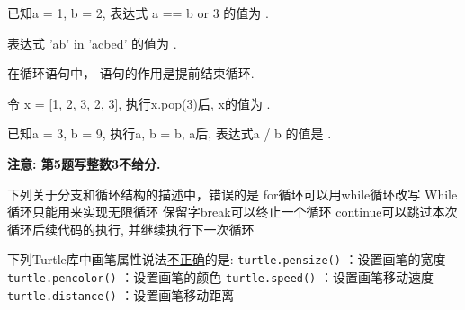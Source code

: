 \documentclass[hideanswer=true,
enfont=empty,	%
zhfont=empty,	%
mathfont=newtxmath,
]{cmcthesis}
\begin{document}
	
\addvspace{1\bigskipamount}



\begin{problem}
	已知a = 1, b = 2, 表达式 a == b or 3 的值为 .
\end{problem}

\begin{problem}
	表达式 'ab' in 'acbed' 的值为 .
\end{problem}

\begin{problem}
	在循环语句中，  语句的作用是提前结束循环.
\end{problem}

\begin{problem}
	令 x = [1, 2, 3, 2, 3], 执行x.pop(3)后, x的值为 \fillin{ [1, 2, 3, 3] }.
\end{problem}

\begin{problem}
	已知a = 3, b = 9, 执行a, b = b, a后, 表达式a / b 的值是 .
\end{problem}
\begin{answer}
	\textbf{注意: 第5题写整数3不给分.}
\end{answer}


\begin{problem}
	下列关于分支和循环结构的描述中，错误的是  
	\options
	{for循环可以用while循环改写}
	{While循环只能用来实现无限循环}
	{保留字break可以终止一个循环}
	{continue可以跳过本次循环后续代码的执行, 并继续执行下一次循环}	
\end{problem}

\begin{problem}
	下列Turtle库中画笔属性说法\uline{不正确}的是:  
	\options
	{\texttt{turtle.pensize()} ：设置画笔的宽度}	%
	{\texttt{turtle.pencolor()} ：设置画笔的颜色}
	{\texttt{turtle.speed()} ：设置画笔移动速度}
	{\texttt{turtle.distance()} ：设置画笔移动距离}
\end{problem}
\end{document}
